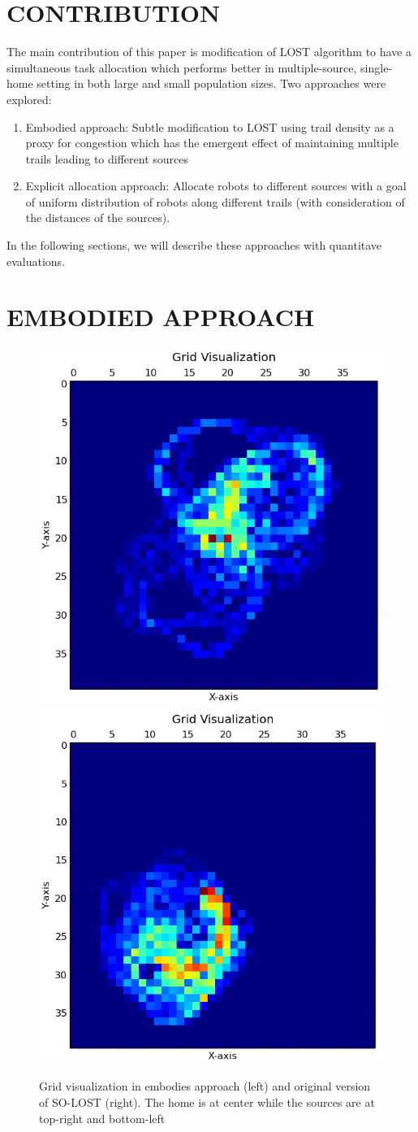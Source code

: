 \documentclass[letterpaper, 10 pt, conference]{ieeeconf}  %
\begin{document}
\section{CONTRIBUTION}

The main contribution of this paper is modification of LOST algorithm to have a simultaneous task allocation which performs better in multiple-source, single-home setting in both large and small population sizes. Two approaches were explored:

\begin{enumerate}
  \item Embodied approach: Subtle modification to LOST using trail density as a proxy for congestion which has the emergent effect of maintaining multiple trails leading to different sources
  \item Explicit allocation approach: Allocate robots to different sources with a goal of uniform distribution of robots along different trails (with consideration of the distances of the sources).
\end{enumerate}

In the following sections, we will describe these approaches with quantitave evaluations.

\section{EMBODIED APPROACH} \label{sec:embodied_approach}

\begin{figure}
   \includegraphics[width=0.49\linewidth]{grid1.png}
   \includegraphics[width=0.49\linewidth]{grid2.png}
   \centering
   \caption{Grid visualization in embodies approach (left) and original version of SO-LOST (right). The home is at center while the sources are at top-right and bottom-left}
   \label{fig:grid_visualization}
\end{figure}
\end{document}

